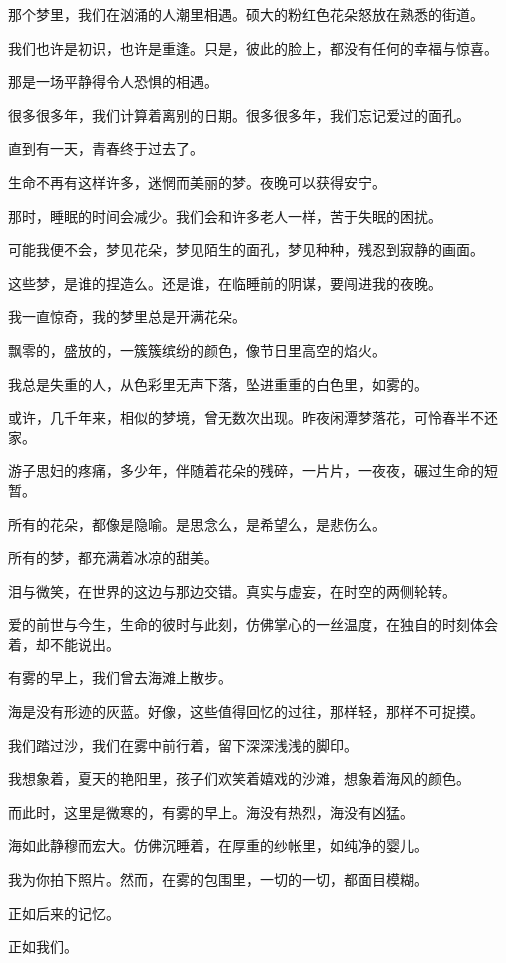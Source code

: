 \documentclass[12pt,a4paper]{article}
\begin{document}
		那个梦里，我们在汹涌的人潮里相遇。硕大的粉红色花朵怒放在熟悉的街道。\par
		我们也许是初识，也许是重逢。只是，彼此的脸上，都没有任何的幸福与惊喜。\par
		那是一场平静得令人恐惧的相遇。\par
		很多很多年，我们计算着离别的日期。很多很多年，我们忘记爱过的面孔。\par
		直到有一天，青春终于过去了。\par
		生命不再有这样许多，迷惘而美丽的梦。夜晚可以获得安宁。\par
		那时，睡眠的时间会减少。我们会和许多老人一样，苦于失眠的困扰。\par
		可能我便不会，梦见花朵，梦见陌生的面孔，梦见种种，残忍到寂静的画面。

		这些梦，是谁的捏造么。还是谁，在临睡前的阴谋，要闯进我的夜晚。\par
		我一直惊奇，我的梦里总是开满花朵。\par
		飘零的，盛放的，一簇簇缤纷的颜色，像节日里高空的焰火。\par
		我总是失重的人，从色彩里无声下落，坠进重重的白色里，如雾的。\par
		或许，几千年来，相似的梦境，曾无数次出现。昨夜闲潭梦落花，可怜春半不还家。\par
		游子思妇的疼痛，多少年，伴随着花朵的残碎，一片片，一夜夜，碾过生命的短暂。\par
		所有的花朵，都像是隐喻。是思念么，是希望么，是悲伤么。\par
		所有的梦，都充满着冰凉的甜美。\par
		泪与微笑，在世界的这边与那边交错。真实与虚妄，在时空的两侧轮转。

		爱的前世与今生，生命的彼时与此刻，仿佛掌心的一丝温度，在独自的时刻体会着，却不能说出。

		有雾的早上，我们曾去海滩上散步。\par
		海是没有形迹的灰蓝。好像，这些值得回忆的过往，那样轻，那样不可捉摸。\par
		我们踏过沙，我们在雾中前行着，留下深深浅浅的脚印。\par
		我想象着，夏天的艳阳里，孩子们欢笑着嬉戏的沙滩，想象着海风的颜色。\par
		而此时，这里是微寒的，有雾的早上。海没有热烈，海没有凶猛。\par
		海如此静穆而宏大。仿佛沉睡着，在厚重的纱帐里，如纯净的婴儿。\par
		我为你拍下照片。然而，在雾的包围里，一切的一切，都面目模糊。\par
		正如后来的记忆。\par
		正如我们。
\end{document}
